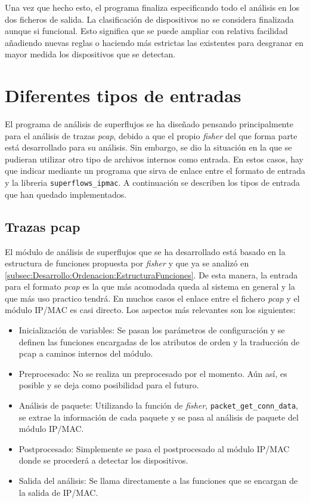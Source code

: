 \documentclass[twoside, 12pt]{epstfg}
\begin{document}
Una vez que hecho esto, el programa finaliza especificando todo el análisis en los dos ficheros de salida. La clasificación de dispositivos no se considera finalizada aunque si funcional. Esto significa que se puede ampliar con relativa facilidad añadiendo nuevas reglas o haciendo más estrictas las existentes para desgranar en mayor medida los dispositivos que se detectan.


\section{Diferentes tipos de entradas}
El programa de análisis de superflujos se ha diseñado pensando principalmente para el análisis de trazas \textit{pcap}, debido a que el propio \textit{fisher} del que forma parte está desarrollado para su análisis. Sin embargo, se dio la situación en la que se pudieran utilizar otro tipo de archivos internos como entrada. En estos casos, hay que indicar mediante un programa que sirva de enlace entre el formato de entrada y la libreria \texttt{superflows\_ipmac}. A continuación se describen los tipos de entrada que han quedado implementados.

\subsection{Trazas pcap}
El módulo de análisis de superflujos que se ha desarrollado está basado en la estructura de funciones propuesta por \textit{fisher} y que ya se analizó en \ref{subsec:Desarrollo:Ordenacion:EstructuraFunciones}. De esta manera, la entrada para el formato \textit{pcap} es la que más acomodada queda al sistema en general y la que más uso practico tendrá. En muchos casos el enlace entre el fichero \textit{pcap} y el módulo IP/MAC es casi directo. Los aspectos más relevantes son los siguientes:

\begin{itemize}
	\item{Inicialización de variables: }Se pasan los parámetros de configuración y se definen las funciones encargadas de los atributos de orden y la traducción de pcap a caminos internos del módulo.
	\item{Preprocesado: }No se realiza un preprocesado por el momento. Aún así, es posible y se deja como posibilidad para el futuro.
	\item{Análisis de paquete: }Utilizando la función de \textit{fisher}, \texttt{packet\_get\_conn\_data}, se extrae la información de cada paquete y se pasa al análisis de paquete del módulo IP/MAC.
	\item{Postprocesado: }Simplemente se pasa el postprocesado al módulo IP/MAC donde se procederá a detectar los dispositivos.
	\item{Salida del análisis: }Se llama directamente a las funciones que se encargan de la salida de IP/MAC.
\end{itemize}
\end{document}
